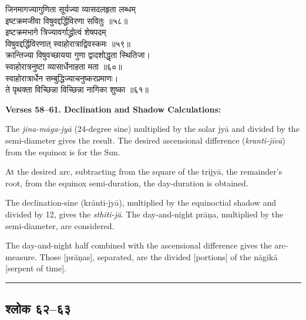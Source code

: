 \documentclass[11pt,a4paper]{article}
\newcommand{\longline}{\noindent\rule{\textwidth}{0.4pt}}
\newcommand{\dev}[1]{{\devanagarifont #1}}
\newcommand{\sectsep}{\par\vspace{0.8em}\longline\vspace{0.8em}}
\begin{document}
\begin{minipage}[t]{0.48\textwidth}
\small\devanagarifont
जिनमागज्यागुणिता सूर्यज्या व्यासदलहृता लब्धम्\\
इष्टक्रमजीवा विषुवद्दर्द्धिविरणा सवितुः ॥५८॥\\[0.5em]
इष्टक्रमभागे त्रिज्यावर्गाद्ध्रोत्वं शेषपदम्\\
विषुवद्दर्द्धिविरणात् स्वाहोरात्राद्विवस्कमः ॥५९॥\\[0.5em]
क्रान्तिज्या विषुवच्छायया गुणा द्वादशोद्धृता स्थितिजा।\\
स्वाहोरात्रनुष्टा व्यासार्धेनाहता मता ॥६०॥\\[0.5em]
स्वाहोरात्रार्धेन सम्बुद्धिज्याचनुष्करप्रमाणः।\\
ते पृथक्ता विच्छिन्ना विच्छिन्ना नागिका शुष्का ॥६१॥
\end{minipage}%
\hfill
\begin{minipage}[t]{0.48\textwidth}
\small
\textbf{Verses 58--61. Declination and Shadow Calculations:}

The \textit{jina-m\=aga-jy\=a} (24-degree sine) multiplied by the solar jy\=a and divided by the semi-diameter gives the result. The desired ascensional difference (\textit{kranti-j\=iv\=a}) from the equinox is for the Sun.

At the desired arc, subtracting from the square of the trijy\=a, the remainder's root, from the equinox semi-duration, the day-duration is obtained.

The declination-sine (kr\=anti-jy\=a), multiplied by the equinoctial shadow and divided by 12, gives the \textit{sthiti-j\=a}. The day-and-night pr\=a\d{n}a, multiplied by the semi-diameter, are considered.

The day-and-night half combined with the ascensional difference gives the arc-measure. Those [pr\=a\d{n}as], separated, are the divided [portions] of the n\=agik\=a [serpent of time].
\end{minipage}

\sectsep

\subsection{\dev{श्लोक ६२--६३}}
\end{document}
